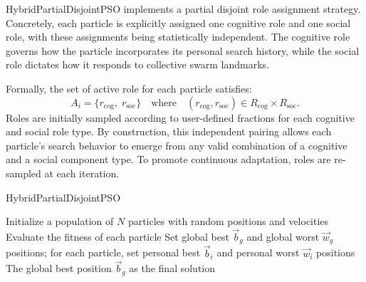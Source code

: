 {HybridPartialDisjointPSO implements a partial disjoint role assignment strategy. Concretely, each particle is explicitly assigned one cognitive role and one social role, with these assignments being statistically independent. The cognitive role governs how the particle incorporates its personal search history, while the social role dictates how it responds to collective swarm landmarks.

Formally, the set of active role for each particle satisfies:
\begin{equation}\label{eq:partialdisjoint_roles}
A_i = \{ r_\text{cog},\; r_\text{soc} \}
\quad \text{where} \quad
(r_\text{cog}, r_\text{soc}) \in R_\text{cog} \times R_\text{soc}.
\end{equation}
Roles are initially sampled according to user-defined fractions for each cognitive and social role type. By construction, this independent pairing allows each particle’s search behavior to emerge from any valid combination of a cognitive and a social component type. To promote continuous adaptation, roles are re-sampled at each iteration.



\enlargethispage{.2\baselineskip}

\vspace{.935em}
\begin{algorithm}[H]
\caption{HybridPartialDisjointPSO}\label{alg:hybridpartialdisjoint}
Initialize a population of \(N\) particles with random positions and velocities\;  
Evaluate the fitness of each particle\;  
Set global best \(\vec{b}_g\) and global worst \(\vec{w}_g\) positions; for each particle, set personal best \(\vec{b}_i\) and personal worst \(\vec{w}_i\) positions\;  
\Return The global best position \(\vec{b}_g\) as the final solution \;
\end{algorithm}

}
